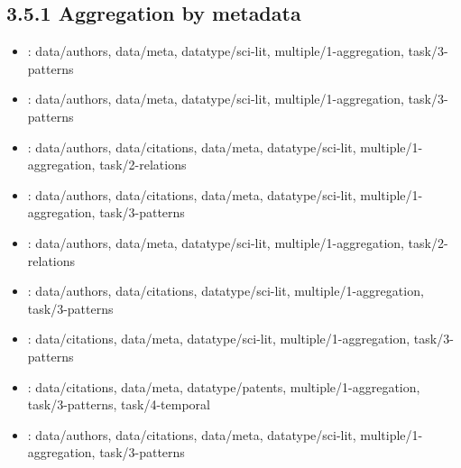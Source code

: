\begin {refsection}
\section [3.5.1 Aggregation by metadata] {3.5.1 Aggregation by metadata}

\begin {itemize}
\item \cite {honkela-2011-media-map:-a-multilingual-document-map-with}:
    data/authors, data/meta, datatype/sci-lit, multiple/1-aggregation, task/3-patterns


\item \cite {jusufi-2014-visual-exploration-of-relationships-between-document}:
    data/authors, data/meta, datatype/sci-lit, multiple/1-aggregation, task/3-patterns


\item \cite {henry-riche-2007-20-years-of-four-hci-conferences:-a-visual-exploration}:
    data/authors, data/citations, data/meta, datatype/sci-lit, multiple/1-aggregation, task/2-relations


\item \cite {nagel-2012-interactive-exploration-of-geospatial-network-visualization}:
    data/authors, data/citations, data/meta, datatype/sci-lit, multiple/1-aggregation, task/3-patterns


\item \cite {chinchilla-rodriguez-2010-new-approach-to-the-visualization-of-international-scientific-collaboration}:
    data/authors, data/meta, datatype/sci-lit, multiple/1-aggregation, task/2-relations


\item \cite {chen-2001-visualizing-a-knowledge-domains-intellectual-structure}:
    data/authors, data/citations, datatype/sci-lit, multiple/1-aggregation, task/3-patterns


\item \cite {rosvall-2008-maps-of-random-walks-on-complex-networks}:
    data/citations, data/meta, datatype/sci-lit, multiple/1-aggregation, task/3-patterns


\item \cite {windhager-2015-a-concept-for-the-exploratory-visualization-of-patent-network}:
    data/citations, data/meta, datatype/patents, multiple/1-aggregation, task/3-patterns, task/4-temporal


\item \cite {lin-2003-real-time-author-co-citation-mapping-for-online}:
    data/authors, data/citations, data/meta, datatype/sci-lit, multiple/1-aggregation, task/3-patterns



\end{itemize}
\end{refsection}

